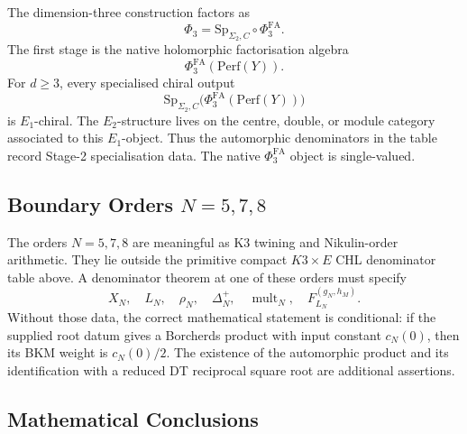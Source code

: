 The dimension-three construction factors as
\[
        \Phi_3=\mathrm{Sp}_{\Sigma_2,C}\circ\Phi^{\mathrm{FA}}_3 .
\]
The first stage is the native holomorphic factorisation algebra
\[
        \Phi^{\mathrm{FA}}_3(\mathrm{Perf}(Y)).
\]
For \(d\geq3\), every specialised chiral output
\[
        \mathrm{Sp}_{\Sigma_2,C}
        \bigl(\Phi^{\mathrm{FA}}_3(\mathrm{Perf}(Y))\bigr)
\]
is \(E_1\)-chiral.  The \(E_2\)-structure lives on the centre, double,
or module category associated to this \(E_1\)-object.  Thus the
automorphic denominators in the table record Stage-2 specialisation
data.  The native \(\Phi^{\mathrm{FA}}_3\) object is single-valued.

\subsection*{Boundary Orders \(N=5,7,8\)}
\label{sec:frontier-boundary-orders}

The orders \(N=5,7,8\) are meaningful as K3 twining and
Nikulin-order arithmetic.  They lie outside the primitive compact
\(K3\times E\) CHL denominator table above.  A denominator theorem at
one of these orders must specify
\[
        X_N,\quad L_N,\quad \rho_N,\quad
        \Delta_N^+,\quad \operatorname{mult}_N,\quad
        F^{(g_N,h_M)}_{L_N}.
\]
Without those data, the correct mathematical statement is conditional:
if the supplied root datum gives a Borcherds product with input
constant \(c_N(0)\), then its BKM weight is \(c_N(0)/2\).  The
existence of the automorphic product and its identification with a
reduced DT reciprocal square root are additional assertions.

\subsection*{Mathematical Conclusions}
\label{sec:frontier-conclusions}

